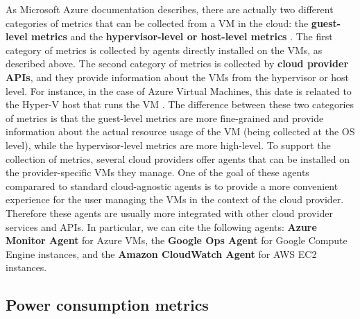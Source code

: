 As Microsoft Azure documentation describes, there are actually two different categories of metrics that can be collected from a VM in the cloud: the \textbf{guest-level metrics} and the \textbf{hypervisor-level or host-level metrics} \cite{azure_vm_monitoring}.
The first category of metrics is collected by agents directly installed on the VMs, as described above.
The second category of metrics is collected by \textbf{cloud provider APIs}, and they provide information about the VMs from the hypervisor or host level.
For instance, in the case of Azure Virtual Machines, this date is relaated to the Hyper-V host that runs the VM \cite{azure_vm_monitoring}.
The difference between these two categories of metrics is that the guest-level metrics are more fine-grained and provide information about the actual resource usage of the VM (being collected at the OS level), while the hypervisor-level metrics are more high-level. \newline
To support the collection of metrics, several cloud providers offer agents that can be installed on the provider-specific VMs they manage.
One of the goal of these agents comparared to standard cloud-agnostic agents is to provide a more convenient experience for the user managing the VMs in the context of the cloud provider. 
Therefore these agents are usually more integrated with other cloud provider services and APIs.
In particular, we can cite the following agents: \textbf{Azure Monitor Agent} for Azure VMs, the \textbf{Google Ops Agent} for Google Compute Engine instances, and the \textbf{Amazon CloudWatch Agent} for AWS EC2 instances.

\subsection{Power consumption metrics}


